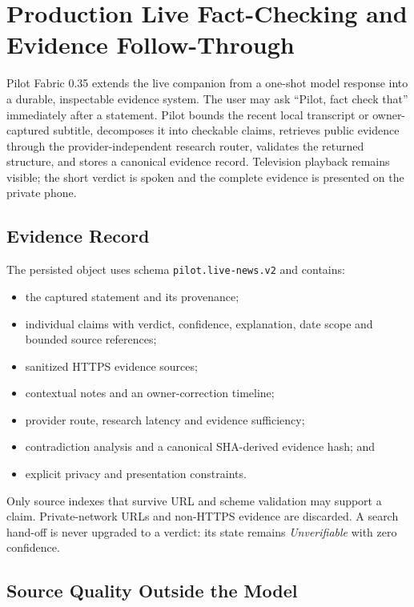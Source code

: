 \section{Production Live Fact-Checking and Evidence Follow-Through}
\label{sec:pilot-production-fact-checking}

Pilot Fabric 0.35 extends the live companion from a one-shot model response into
a durable, inspectable evidence system.  The user may ask ``Pilot, fact check
that'' immediately after a statement.  Pilot bounds the recent local transcript
or owner-captured subtitle, decomposes it into checkable claims, retrieves public
evidence through the provider-independent research router, validates the returned
structure, and stores a canonical evidence record.  Television playback remains
visible; the short verdict is spoken and the complete evidence is presented on
the private phone.

\subsection{Evidence Record}

The persisted object uses schema \texttt{pilot.live-news.v2} and contains:
\begin{itemize}
  \item the captured statement and its provenance;
  \item individual claims with verdict, confidence, explanation, date scope and
        bounded source references;
  \item sanitized HTTPS evidence sources;
  \item contextual notes and an owner-correction timeline;
  \item provider route, research latency and evidence sufficiency;
  \item contradiction analysis and a canonical SHA-derived evidence hash; and
  \item explicit privacy and presentation constraints.
\end{itemize}
Only source indexes that survive URL and scheme validation may support a claim.
Private-network URLs and non-HTTPS evidence are discarded.  A search hand-off is
never upgraded to a verdict: its state remains \emph{Unverifiable} with zero
confidence.

\subsection{Source Quality Outside the Model}

